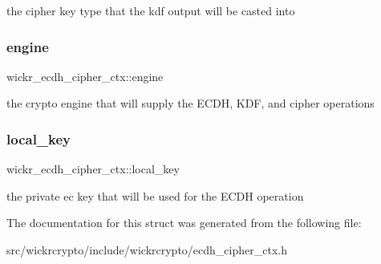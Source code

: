 the cipher key type that the kdf output will be casted into \mbox{\label{structwickr__ecdh__cipher__ctx_a4d953a0c8d6302db63f2fce624e6ffc2}} 
\subsubsection{\texorpdfstring{engine}{engine}}
{\footnotesize\ttfamily wickr\+\_\+ecdh\+\_\+cipher\+\_\+ctx\+::engine}

the crypto engine that will supply the E\+C\+DH, K\+DF, and cipher operations \mbox{\label{structwickr__ecdh__cipher__ctx_ad9389a9efc31ac0516d9aebeb1ac6301}} 
\subsubsection{\texorpdfstring{local\_key}{local\_key}}
{\footnotesize\ttfamily wickr\+\_\+ecdh\+\_\+cipher\+\_\+ctx\+::local\+\_\+key}

the private ec key that will be used for the E\+C\+DH operation 

The documentation for this struct was generated from the following file\+:\begin{DoxyCompactItemize}
\item 
src/wickrcrypto/include/wickrcrypto/ecdh\+\_\+cipher\+\_\+ctx.\+h\end{DoxyCompactItemize}
